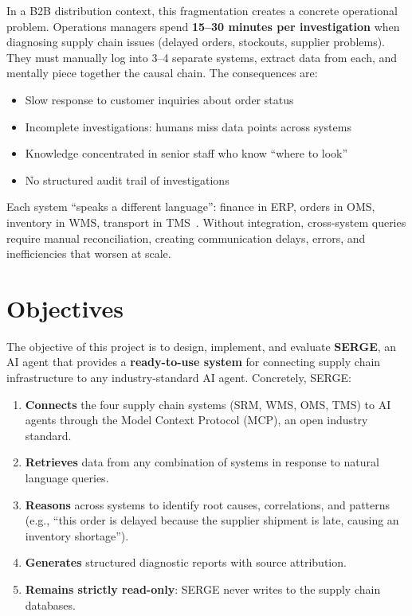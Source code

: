 \documentclass[12pt,a4paper]{report}
\begin{document}
In a B2B distribution context, this fragmentation creates a concrete operational problem. Operations managers spend \textbf{15--30 minutes per investigation} when diagnosing supply chain issues (delayed orders, stockouts, supplier problems). They must manually log into 3--4 separate systems, extract data from each, and mentally piece together the causal chain. The consequences are:

\begin{itemize}[itemsep=0.3em]
    \item Slow response to customer inquiries about order status
    \item Incomplete investigations: humans miss data points across systems
    \item Knowledge concentrated in senior staff who know ``where to look''
    \item No structured audit trail of investigations
\end{itemize}

Each system ``speaks a different language'': finance in ERP, orders in OMS, inventory in WMS, transport in TMS~\cite{aws2024sync}. Without integration, cross-system queries require manual reconciliation, creating communication delays, errors, and inefficiencies that worsen at scale.

\section{Objectives}

The objective of this project is to design, implement, and evaluate \textbf{SERGE}, an AI agent that provides a \textbf{ready-to-use system} for connecting supply chain infrastructure to any industry-standard AI agent. Concretely, SERGE:

\begin{enumerate}[itemsep=0.3em]
    \item \textbf{Connects} the four supply chain systems (SRM, WMS, OMS, TMS) to AI agents through the Model Context Protocol (MCP), an open industry standard.
    \item \textbf{Retrieves} data from any combination of systems in response to natural language queries.
    \item \textbf{Reasons} across systems to identify root causes, correlations, and patterns (e.g., ``this order is delayed because the supplier shipment is late, causing an inventory shortage'').
    \item \textbf{Generates} structured diagnostic reports with source attribution.
    \item \textbf{Remains strictly read-only}: SERGE never writes to the supply chain databases.
\end{enumerate}
\end{document}
